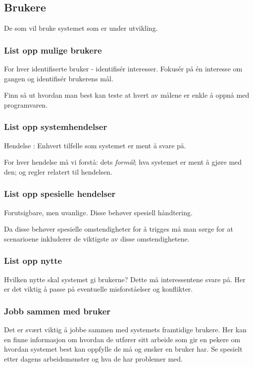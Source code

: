 \subsection{Brukere}

De som vil bruke systemet som er under utvikling.

\subsubsection{List opp mulige brukere}

For hver identifiserte bruker - identifisér interesser. Fokusér på én
interesse om gangen og identifisér brukerens mål.

Finn så ut hvordan man best kan teste at hvert av målene er enkle å
oppnå med programvaren.

\subsubsection{List opp systemhendelser}

Hendelse : Enhvert tilfelle som systemet er ment å svare på.

For hver hendelse må vi forstå: dets \emph{formål}; hva systemet er ment
å gjøre med den; og regler relatert til hendelsen.

\subsubsection{List opp spesielle hendelser}

Forutsigbare, men uvanlige. Disse behøver spesiell håndtering.

Da disse behøver spesielle omstendigheter for å trigges må man sørge for
at scenarioene inkluderer de viktigste av disse omstendighetene.

\subsubsection{List opp nytte}

Hvilken nytte skal systemet gi brukerne? Dette må interessentene svare
på. Her er det viktig å passe på eventuelle misforståelser og
konflikter.

\subsubsection{Jobb sammen med bruker}

Det er svært viktig å jobbe sammen med systemets framtidige brukere. Her
kan en finne informasjon om hvordan de utfører sitt arbeide som gir en
pekere om hvordan systemet best kan oppfylle de må og ønsker en bruker
har. Se spesielt etter dagens arbeidsmønster og hva de har problemer
med.

